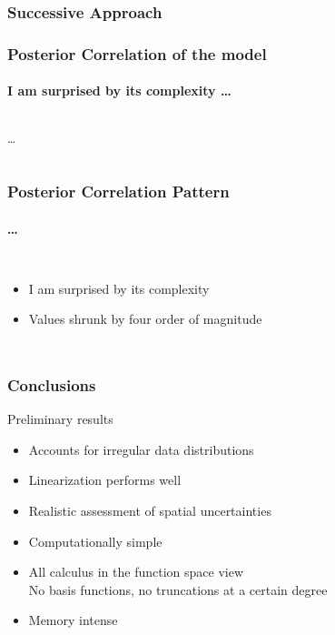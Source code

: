 \documentclass[aspectratio=169, t, 10pt]{beamer}
\begin{document}
\begin{frame}
    \frametitle{Successive Approach}
    \begin{center}
    \end{center}
\end{frame}

\begin{frame}
    \frametitle{Posterior Correlation of the model }
    \framesubtitle{I am surprised by its complexity \dots }

\begin{columns}
%
    \dots

    \vspace{-10mm}

\end{columns}

\end{frame}


\begin{frame}
    \frametitle{Posterior Correlation Pattern}
    \framesubtitle{\dots }

\begin{columns}
%
    \begin{itemize}
        \item I am surprised by its complexity
        \item Values shrunk by four order of magnitude
    \end{itemize}

    \vspace{-10mm}

\end{columns}

\end{frame}

\begin{frame}
    \frametitle{Conclusions}

    

    Preliminary results
    \begin{itemize}
        \item Accounts for irregular data distributions
        \item Linearization performs well
        \item Realistic assessment of spatial uncertainties
        \item Computationally simple
        \item All calculus in the function space view \\
              No basis functions, no truncations at a certain degree
        \item Memory intense
    \end{itemize}


\end{frame}
\end{document}
